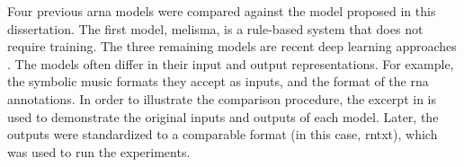 
Four previous \gls{arna} models were compared against the
model proposed in this dissertation. The first model,
\gls{melisma}, is a rule-based system that does not require
training. The three remaining models are recent deep
learning approaches \parencite{chen2021attend,
micchi2021deep, mcleod2021modular}. The models often differ
in their input and output representations. For example, the
symbolic music formats they accept as inputs, and the format
of the \gls{rna} annotations. In order to illustrate the
comparison procedure, the excerpt in  is
used to demonstrate the original inputs and outputs of each
model. Later, the outputs were standardized to a comparable
format (in this case, \gls{rntxt}), which was used to run
the experiments.

